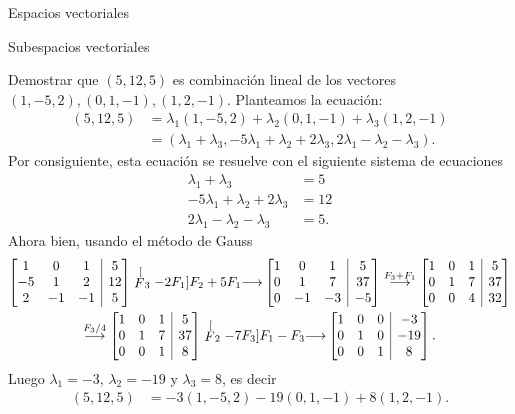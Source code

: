 \begin{chapter}{Espacios vectoriales}
\begin{section}{Subespacios vectoriales}
\begin{ejemplo*} Demostrar que $(5,12,5)$  es combinación lineal de los vectores $(1,-5,2), (0,1,-1), (1,2,-1)$. Planteamos la ecuación:
    \begin{align*}
        (5,12,5) &= \lambda_1(1,-5,2)+\lambda_2 (0,1,-1)+\lambda_3 (1,2,-1) 
        \\&= (\lambda_1+\lambda_3,-5\lambda_1+\lambda_2+2\lambda_3,2\lambda_1-\lambda_2-\lambda_3).
    \end{align*}
    Por consiguiente,  esta ecuación se resuelve con el siguiente sistema de ecuaciones
    \begin{align*}
        \lambda_1+\lambda_3 &= 5 \\
        -5\lambda_1+\lambda_2+2\lambda_3 &= 12 \\
        2\lambda_1-\lambda_2-\lambda_3 &= 5.
    \end{align*}
    Ahora bien, usando el método de Gauss
                        \begin{multline*}
    \left[\begin{array}{@{}*{3}{c}|c@{}}1 & 0 & 1 &  5 \\ -5 & 1 & 2 &  12 \\	2 & -1 & -1 &  5  \end{array}\right]
    \stackrel[F_3 -2F_1]{F_2 + 5F_1}{\longrightarrow} 
    \left[\begin{array}{@{}*{3}{c}|c@{}}1 & 0 & 1 &  5 \\ 0 & 1 & 7 &  37 \\	0 & -1 & -3 &  -5  \end{array}\right]
    \stackrel{F_3+F_1}{\longrightarrow} 
    \left[\begin{array}{@{}*{3}{c}|c@{}}1 & 0 & 1 &  5 \\ 0 & 1 & 7 &  37 \\	0 & 0 & 4 & 32  \end{array}\right]
    \\
    \stackrel{F_3/4}{\longrightarrow} 
    \left[\begin{array}{@{}*{3}{c}|c@{}}1 & 0 & 1 & 5 \\ 0 & 1 & 7 & 37 \\	0 & 0 & 1& 8  \end{array}\right]
    \stackrel[F_2 -7F_3]{F_1 - F_3}{\longrightarrow}
    \left[\begin{array}{@{}*{3}{c}|c@{}}1 & 0 & 0 & -3 \\ 0 & 1 & 0 &  -19 \\	0 & 0 & 1& 8  \end{array}\right].
    \end{multline*}	
    Luego $\lambda_1= -3$, $\lambda_2 = -19$ y $\lambda_3=8$,  es decir
    \begin{align*}
    (5,12,5) &= -3(1,-5,2)-19 (0,1,-1)+8 (1,2,-1).
    \end{align*}
\end{ejemplo*}


\end{section}
\end{chapter}
